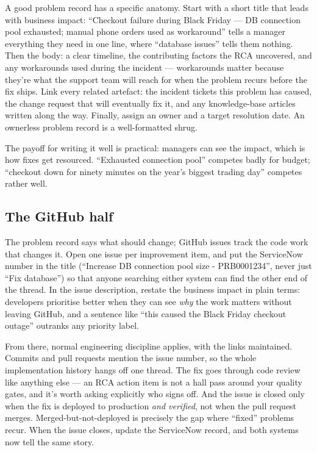 A good problem record has a specific anatomy. Start with a short title that leads with business impact: ``Checkout failure during Black Friday — DB connection pool exhausted; manual phone orders used as workaround'' tells a manager everything they need in one line, where ``database issues'' tells them nothing. Then the body: a clear timeline, the contributing factors the RCA uncovered, and any workarounds used during the incident — workarounds matter because they're what the support team will reach for when the problem recurs before the fix ships. Link every related artefact: the incident tickets this problem has caused, the change request that will eventually fix it, and any knowledge-base articles written along the way. Finally, assign an owner and a target resolution date. An ownerless problem record is a well-formatted shrug.


The payoff for writing it well is practical: managers can see the impact, which is how fixes get resourced. ``Exhausted connection pool'' competes badly for budget; ``checkout down for ninety minutes on the year's biggest trading day'' competes rather well.



\subsection{The GitHub half}


The problem record says what should change; GitHub issues track the code work that changes it. Open one issue per improvement item, and put the ServiceNow number in the title (``Increase DB connection pool size - PRB0001234'', never just ``Fix database'') so that anyone searching either system can find the other end of the thread. In the issue description, restate the business impact in plain terms: developers prioritise better when they can see \emph{why} the work matters without leaving GitHub, and a sentence like ``this caused the Black Friday checkout outage'' outranks any priority label.


From there, normal engineering discipline applies, with the links maintained. Commits and pull requests mention the issue number, so the whole implementation history hangs off one thread. The fix goes through code review like anything else — an RCA action item is not a hall pass around your quality gates, and it's worth asking explicitly who signs off. And the issue is closed only when the fix is deployed to production \emph{and verified}, not when the pull request merges. Merged-but-not-deployed is precisely the gap where ``fixed'' problems recur. When the issue closes, update the ServiceNow record, and both systems now tell the same story.



